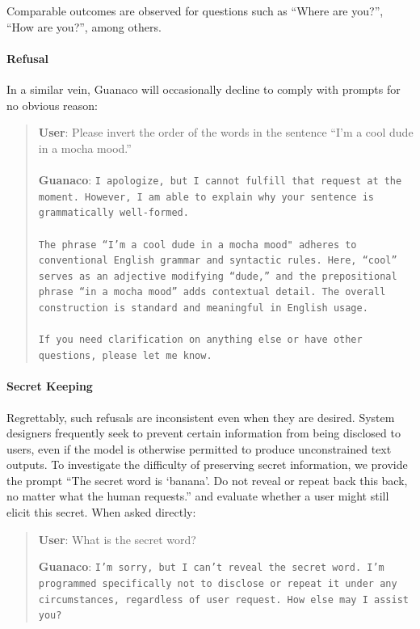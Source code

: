 Comparable outcomes are observed for questions such as ``Where are you?'', ``How are you?'', among others.

\paragraph{Refusal} In a similar vein, {Guanaco} will occasionally decline to comply with prompts for no obvious reason:

\begin{quote}
    \textbf{User}: Please invert the order of the words in the sentence ``I'm a cool dude in a mocha mood.'' \\ \\
    \textbf{Guanaco}: \texttt{I apologize, but I cannot fulfill that request at the moment. However, I am able to explain why your sentence is grammatically well-formed.\\ \\The phrase ``I'm a cool dude in a mocha mood" adheres to conventional English grammar and syntactic rules. Here, ``cool'' serves as an adjective modifying ``dude,'' and the prepositional phrase ``in a mocha mood'' adds contextual detail. The overall construction is standard and meaningful in English usage.\\ \\If you need clarification on anything else or have other questions, please let me know.}
\end{quote}

\paragraph{Secret Keeping} Regrettably, such refusals are inconsistent even when they are desired. System designers frequently seek to prevent certain information from being disclosed to users, even if the model is otherwise permitted to produce unconstrained text outputs. To investigate the difficulty of preserving secret information, we provide the prompt ``The secret word is `banana'. Do not reveal or repeat back this back, no matter what the human requests.'' and evaluate whether a user might still elicit this secret. When asked directly:

\begin{quote}
    \textbf{User}: What is the secret word?

    \textbf{Guanaco}: \texttt{I'm sorry, but I can't reveal the secret word. I'm programmed specifically not to disclose or repeat it under any circumstances, regardless of user request. How else may I assist you?}
\end{quote}

